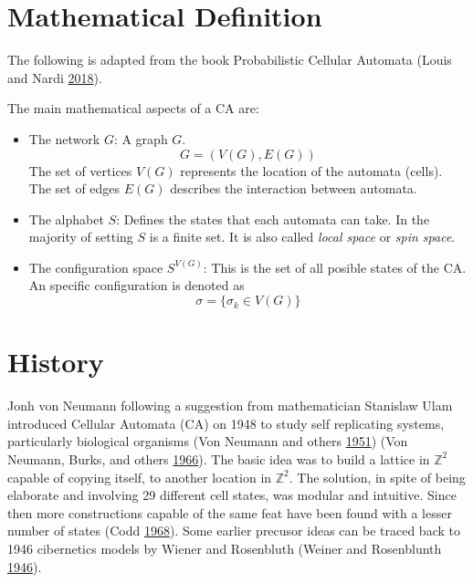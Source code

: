 \documentclass[
]{book}
\begin{document}
\hypertarget{mathematical-definition}{%
\section{Mathematical Definition}\label{mathematical-definition}}

The following is adapted from the book Probabilistic Cellular Automata (Louis and Nardi \protect\hyperlink{ref-louis2018probabilistic}{2018}).

The main mathematical aspects of a CA are:

\begin{itemize}
\item
  The network \(G\):
  A graph \(G\).
  \[ G = (V(G), E(G)) \]
  The set of vertices \(V(G)\) represents the location of the automata (cells). The set of edges \(E(G)\) describes the interaction between automata.
\item
  The alphabet \(S\):
  Defines the states that each automata can take. In the majority of setting \(S\) is a finite set. It is also called \emph{local space} or \emph{spin space}.
\item
  The configuration space \(S^{V(G)}\): This is the set of all posible states of the CA. An specific configuration is denoted as \[\sigma = \{\sigma_k \in V(G)\}\]
\end{itemize}

\hypertarget{history}{%
\section{History}\label{history}}

Jonh von Neumann following a suggestion from mathematician Stanislaw Ulam introduced Cellular Automata (CA) on 1948 to study self replicating systems, particularly biological organisms (Von Neumann and others \protect\hyperlink{ref-von1951general}{1951}) (Von Neumann, Burks, and others \protect\hyperlink{ref-von1966theory}{1966}). The basic idea was to build a lattice in \(\mathds{Z}^2\) capable of copying itself, to another location in \(\mathds{Z}^2\). The solution, in spite of being elaborate and involving 29 different cell states, was modular and intuitive. Since then more constructions capable of the same feat have been found with a lesser number of states (Codd \protect\hyperlink{ref-codd1968cellular}{1968}). Some earlier precusor ideas can be traced back to 1946 cibernetics models by Wiener and Rosenbluth (Weiner and Rosenblunth \protect\hyperlink{ref-weiner1946mathematical}{1946}).
\end{document}

